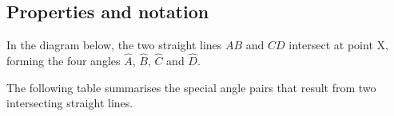 \subsection*{Properties and notation}
\nopagebreak
In the diagram below, the two straight lines $AB$ and $CD$ intersect at point X, forming the four
angles $\hat{A}$, $\hat{B}$, $\hat{C}$ and $\hat{D}$.\par 
\setcounter{subfigure}{0}
 	\begin{figure}[H] 
    \begin{center}
    \end{center}
\label{fig:mg:f:specialangles2}
 \end{figure}        
The following table summarises the special angle pairs that result from two intersecting straight lines.\par 
